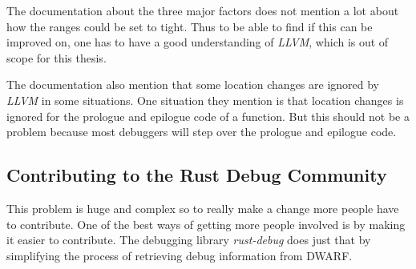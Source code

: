 The documentation about the three major factors does not mention a lot about how the ranges could be set to tight.
Thus to be able to find if this can be improved on, one has to have a good understanding of \emph{LLVM}, which is out of scope for this thesis.


The documentation also mention that some location changes are ignored by \emph{LLVM} in some situations.
One situation they mention is that location changes is ignored for the prologue and epilogue code of a function.
But this should not be a problem because most debuggers will step over the prologue and epilogue code.



\subsection{Contributing to the Rust Debug Community}
This problem is huge and complex so to really make a change more people have to contribute.
One of the best ways of getting more people involved is by making it easier to contribute.
The debugging library \emph{rust-debug} does just that by simplifying the process of retrieving debug information from \gls{DWARF}.



